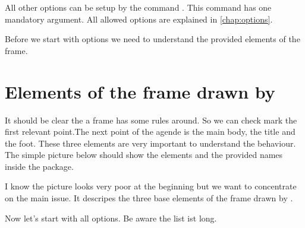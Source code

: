 \documentclass[openany,12pt,tocdepth=3]{ltx-md}
\begin{document}
All other options can be setup by the command .
This command has one mandatory argument. All allowed options are explained
in \autoref{chap:options}. 

Before we start with options we need to understand the provided elements of the frame. 

\section{Elements of the frame drawn by \texorpdfstring{}{xframed}}
It should be clear the a frame has some rules around. So we can check mark the first
relevant point.The next point of the agende is the main body, the title and the foot. These
three elements are very important to understand the behaviour. The simple picture below
should show the elements and the provided names inside the package.

\begin{center}
\label{fig:baseelements}
\end{center}
I know the picture looks very poor at the beginning but we want to concentrate on the
main issue. It descripes the three base elements of the frame drawn by .

\vspace*{\baselineskip}
Now let's start with all options. Be aware the list ist long. 

\end{document}
